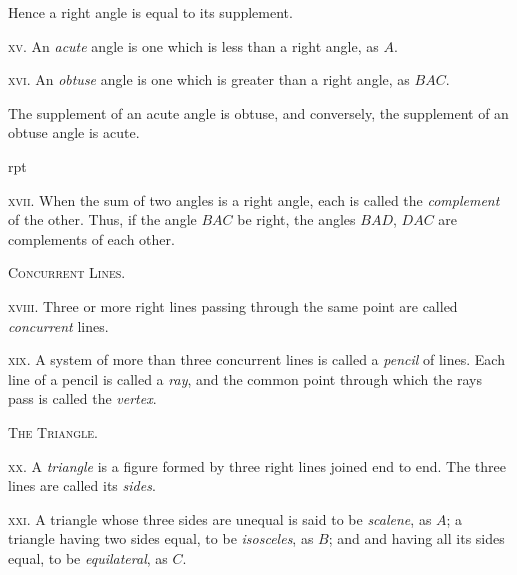\documentclass[oneside]{book}
\newcounter{wrapwidth}
\newcommand\imgflow[3]{
\setcounter{wrapwidth}{#1}

\begin{wrapfigure}[#2]{r}{\value{wrapwidth}pt}
\begin{center}
\vspace{-0.3in}

\end{center}
\end{wrapfigure}
}
\newcommand\imgcent[2]{
\begin{center}

\end{center}
}
\begin{document}
\begin{footnotesize}
Hence a right angle is equal to its supplement.
\par\end{footnotesize}

\textsc{xv}. An \textit{acute} angle is one which is less than a right
angle, as $A$.


\imgcent{266}{f005}

\textsc{xvi}. An \textit{obtuse} angle is one which is greater than a
right angle, as $BAC$.

\begin{footnotesize}
The supplement of an acute angle is obtuse, and conversely, the
supplement of an obtuse
angle is acute.
\par\end{footnotesize}

\imgflow{100}{7}{f006}
\textsc{xvii}. When the sum of two angles
is a right angle, each is called the
\textit{complement} of the other. Thus, if
the angle $BAC$ be right, the angles
$BAD$, $DAC$ are complements of each
other.

\begin{center}
\textsc{Concurrent Lines.}
\end{center}

\textsc{xviii}. Three or more right lines passing through the
same point are called \textit{concurrent} lines.

\textsc{xix}. A system of more than three concurrent lines is
called a \textit{pencil} of lines. Each line of a pencil is called
a \textit{ray}, and the common point through which the rays
pass is called the \textit{vertex}.



\begin{center}
\textsc{The Triangle.}
\end{center}

\textsc{xx}. A \textit{triangle} is a figure formed by three right
lines joined end to end. The three lines are called
its \textit{sides}.

\textsc{xxi}. A triangle whose three sides are unequal is said
to be \textit{scalene}, as $A$; a triangle having two sides equal,
to be \textit{isosceles}, as $B$; and and having all its sides equal,
to be \textit{equilateral}, as $C$.
\end{document}
